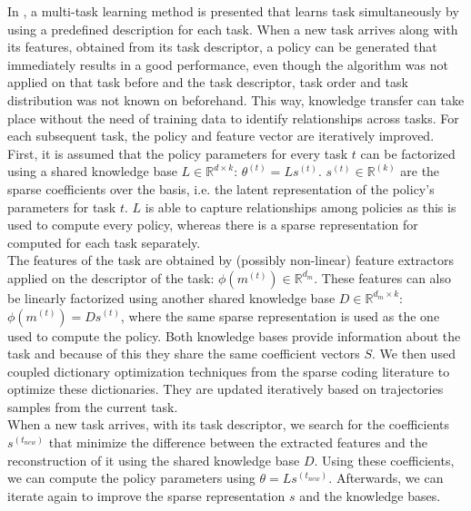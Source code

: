 In \cite{Isele2016UsingLearning}, a multi-task learning method is presented that learns task simultaneously by using a predefined description for each task.
When a new task arrives along with its features, obtained from its task descriptor, a policy can be generated that immediately results in a good performance, even though the algorithm was not applied on that task before and the task descriptor, task order and task distribution was not known on beforehand.
This way, knowledge transfer can take place without the need of training data to identify relationships across tasks. For each subsequent task, the policy and feature vector are iteratively improved.\\
First, it is assumed that the policy parameters for every task $t$ can be factorized using a shared knowledge base $L \in \mathbb{R}^{d \times k}$: $\theta^{(t)} = Ls^{(t)}$. $s^{(t)} \in \mathbb{R}^{(k)}$ are the sparse coefficients over the basis, i.e. the latent representation of the policy's parameters for task $t$. $L$ is able to capture relationships among policies as this is used to compute every policy, whereas there is a sparse representation for computed for each task separately.\\
The features of the task are obtained by (possibly non-linear) feature extractors applied on the descriptor of the task: $\phi(m^{(t)}) \in \mathbb{R}^{d_m}$. These features can also be linearly factorized using another shared knowledge base $D \in \mathbb{R}^{d_m \times k}$: $\phi(m^{(t)}) = Ds^{(t)}$, where the same sparse representation is used as the one used to compute the policy. Both knowledge bases provide information about the task and because of this they share the same coefficient vectors $S$.
We then used coupled dictionary optimization techniques from the sparse coding literature to optimize these dictionaries. They are updated iteratively based on trajectories samples from the current task.\\
When a new task arrives, with its task descriptor, we search for the coefficients $s^{(t_{new})}$ that minimize the difference between the extracted features and the reconstruction of it using the shared knowledge base $D$. Using these coefficients, we can compute the policy parameters using $\theta = Ls^{(t_{new})}$. Afterwards, we can iterate again to improve the sparse representation $s$ and the knowledge bases.

